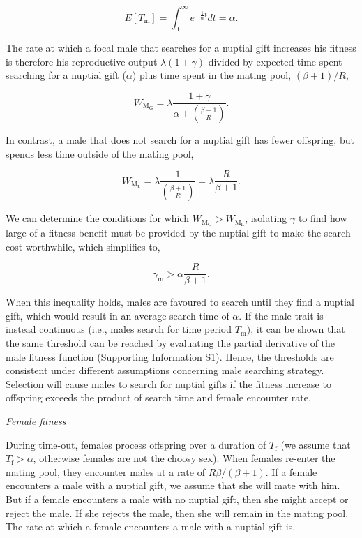 \documentclass[
]{article}
\begin{document}
\[E[T_{\mathrm{m}}] = \int_{0}^{\infty}e^{- \frac{1}{\alpha}t}dt = \alpha.\]

The rate at which a focal male that searches for a nuptial gift
increases his fitness is therefore his reproductive output
\(\lambda(1 + \gamma)\) divided by expected time spent searching for a
nuptial gift (\(\alpha\)) plus time spent in the mating pool,
\((\beta + 1)/R\),

\[W_{\mathrm{M_{G}}} = \lambda \frac{1 + \gamma}{\alpha + \left( \frac{\beta + 1}{R} \right)}.\]

In contrast, a male that does not search for a nuptial gift has fewer
offspring, but spends less time outside of the mating pool,

\[W_{\mathrm{M_{L}}} = \lambda \frac{1}{\left(\frac{\beta+1}{R} \right)} = \lambda \frac{R}{\beta + 1}.\]

We can determine the conditions for which
\(W_{\mathrm{M_{G}}} > W_{\mathrm{M_{L}}}\), isolating \(\gamma\) to
find how large of a fitness benefit must be provided by the nuptial gift
to make the search cost worthwhile, which simplifies to,

\[\gamma_{\mathrm{m}} > \alpha \frac{R}{\beta + 1}.
\tag{2}
\]

When this inequality holds, males are favoured to search until they find
a nuptial gift, which would result in an average search time of
\(\alpha\). If the male trait is instead continuous (i.e., males search
for time period \(T_{\mathrm{m}}\)), it can be shown that the same
threshold can be reached by evaluating the partial derivative of the
male fitness function (Supporting Information S1). Hence, the thresholds
are consistent under different assumptions concerning male searching
strategy. Selection will cause males to search for nuptial gifts if the
fitness increase to offspring exceeds the product of search time and
female encounter rate.

\emph{Female fitness}

During time-out, females process offspring over a duration of
\(T_{\mathrm{f}}\) (we assume that \(T_{\mathrm{f}} > \alpha\),
otherwise females are not the choosy sex). When females re-enter the
mating pool, they encounter males at a rate of \(R\beta/(\beta + 1)\).
If a female encounters a male with a nuptial gift, we assume that she
will mate with him. But if a female encounters a male with no nuptial
gift, then she might accept or reject the male. If she rejects the male,
then she will remain in the mating pool. The rate at which a female
encounters a male with a nuptial gift is,
\end{document}
